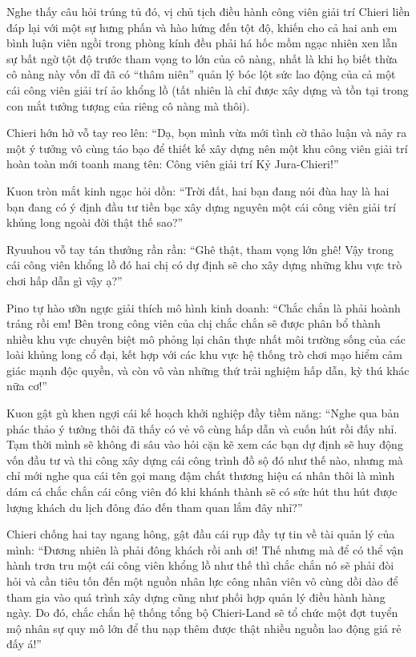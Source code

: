\documentclass[../main.tex]{subfiles}
\begin{document}
Nghe thấy câu hỏi trúng tủ đó, vị chủ tịch điều hành công viên giải trí Chieri liền đáp lại với một sự hưng phấn và hào hứng đến tột độ, khiến cho cả hai anh em bình luận viên ngồi trong phòng kính đều phải há hốc mồm ngạc nhiên xen lẫn sự bất ngờ tột độ trước tham vọng to lớn của cô nàng, nhất là khi họ biết thừa cô nàng này vốn dĩ đã có ``thâm niên'' quản lý bóc lột sức lao động của cả một cái công viên giải trí ảo khổng lồ (tất nhiên là chỉ được xây dựng và tồn tại trong con mắt tưởng tượng của riêng cô nàng mà thôi).

Chieri hớn hở vỗ tay reo lên: ``Dạ, bọn mình vừa mới tình cờ thảo luận và nảy ra một ý tưởng vô cùng táo bạo để thiết kế xây dựng nên một khu công viên giải trí hoàn toàn mới toanh mang tên: Công viên giải trí Kỷ Jura-Chieri!''

Kuon tròn mắt kinh ngạc hỏi dồn: ``Trời đất, hai bạn đang nói đùa hay là hai bạn đang có ý định đầu tư tiền bạc xây dựng nguyên một cái công viên giải trí khủng long ngoài đời thật thế sao?''

Ryuuhou vỗ tay tán thưởng rần rần: ``Ghê thật, tham vọng lớn ghê! Vậy trong cái công viên khổng lồ đó hai chị có dự định sẽ cho xây dựng những khu vực trò chơi hấp dẫn gì vậy ạ?''

Pino tự hào ưỡn ngực giải thích mô hình kinh doanh: ``Chắc chắn là phải hoành tráng rồi em! Bên trong công viên của chị chắc chắn sẽ được phân bổ thành nhiều khu vực chuyên biệt mô phỏng lại chân thực nhất môi trường sống của các loài khủng long cổ đại, kết hợp với các khu vực hệ thống trò chơi mạo hiểm cảm giác mạnh độc quyền, và còn vô vàn những thứ trải nghiệm hấp dẫn, kỳ thú khác nữa cơ!''

Kuon gật gù khen ngợi cái kế hoạch khởi nghiệp đầy tiềm năng: ``Nghe qua bản phác thảo ý tưởng thôi đã thấy có vẻ vô cùng hấp dẫn và cuốn hút rồi đấy nhỉ. Tạm thời mình sẽ không đi sâu vào hỏi cặn kẽ xem các bạn dự định sẽ huy động vốn đầu tư và thi công xây dựng cái công trình đồ sộ đó như thế nào, nhưng mà chỉ mới nghe qua cái tên gọi mang đậm chất thương hiệu cá nhân thôi là mình dám cá chắc chắn cái công viên đó khi khánh thành sẽ có sức hút thu hút được lượng khách du lịch đông đảo đến tham quan lắm đây nhỉ?''

Chieri chống hai tay ngang hông, gật đầu cái rụp đầy tự tin về tài quản lý của mình: ``Đương nhiên là phải đông khách rồi anh ơi! Thế nhưng mà để có thể vận hành trơn tru một cái công viên khổng lồ như thế thì chắc chắn nó sẽ phải đòi hỏi và cần tiêu tốn đến một nguồn nhân lực công nhân viên vô cùng dồi dào để tham gia vào quá trình xây dựng cũng như phối hợp quản lý điều hành hàng ngày. Do đó, chắc chắn hệ thống tổng bộ Chieri-Land sẽ tổ chức một đợt tuyển mộ nhân sự quy mô lớn để thu nạp thêm được thật nhiều nguồn lao động giá rẻ đấy á!''
\end{document}
